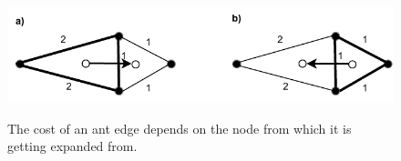 \begin{figure}[h]
	\begin{centering}
		{\includegraphics[scale=0.9]{figures/approach/different_cost.pdf}}
		\caption[Cost of ant edge]{The cost of an ant edge depends on the node from which it is getting expanded from.}
		\label{fig:different_cost}
	\end{centering}
\end{figure}
